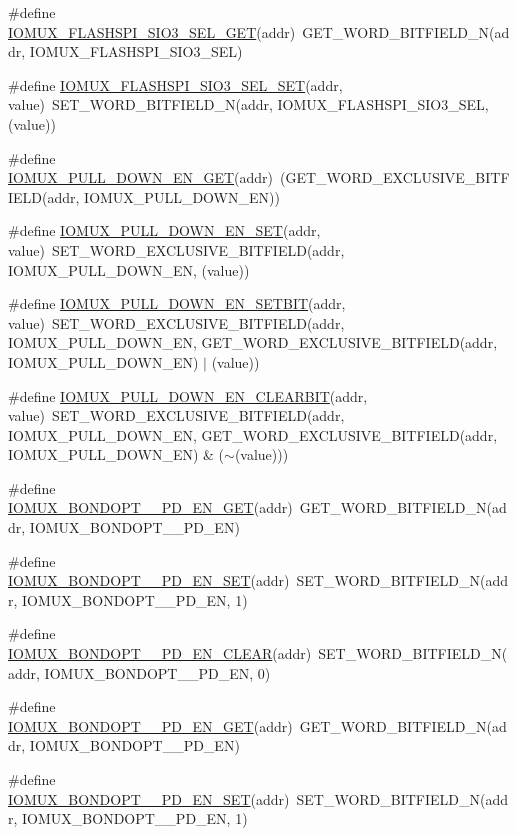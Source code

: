 \begin{DoxyCompactItemize}
\item 
\#define \hyperlink{a00559_a4c2a41675e009709ce5792c688d7d62a}{IOMUX\_\-FLASHSPI\_\-SIO3\_\-SEL\_\-GET}(addr)~GET\_\-WORD\_\-BITFIELD\_\-N(addr, IOMUX\_\-FLASHSPI\_\-SIO3\_\-SEL)
\item 
\#define \hyperlink{a00559_ad926c248ef64ee21e57821fd46ffbe88}{IOMUX\_\-FLASHSPI\_\-SIO3\_\-SEL\_\-SET}(addr, value)~SET\_\-WORD\_\-BITFIELD\_\-N(addr, IOMUX\_\-FLASHSPI\_\-SIO3\_\-SEL, (value))
\item 
\#define \hyperlink{a00559_a71104db525cde5d74f864e5716f4bfad}{IOMUX\_\-PULL\_\-DOWN\_\-EN\_\-GET}(addr)~(GET\_\-WORD\_\-EXCLUSIVE\_\-BITFIELD(addr, IOMUX\_\-PULL\_\-DOWN\_\-EN))
\item 
\#define \hyperlink{a00559_ad9faafa36f5fa3a0e319f2479645d5e1}{IOMUX\_\-PULL\_\-DOWN\_\-EN\_\-SET}(addr, value)~SET\_\-WORD\_\-EXCLUSIVE\_\-BITFIELD(addr, IOMUX\_\-PULL\_\-DOWN\_\-EN, (value))
\item 
\#define \hyperlink{a00559_a1db9e8f2b499c331b1dd4fb9789827ce}{IOMUX\_\-PULL\_\-DOWN\_\-EN\_\-SETBIT}(addr, value)~SET\_\-WORD\_\-EXCLUSIVE\_\-BITFIELD(addr, IOMUX\_\-PULL\_\-DOWN\_\-EN, GET\_\-WORD\_\-EXCLUSIVE\_\-BITFIELD(addr, IOMUX\_\-PULL\_\-DOWN\_\-EN) $|$ (value))
\item 
\#define \hyperlink{a00559_a7f694c31df3c4950d038391274b7996a}{IOMUX\_\-PULL\_\-DOWN\_\-EN\_\-CLEARBIT}(addr, value)~SET\_\-WORD\_\-EXCLUSIVE\_\-BITFIELD(addr, IOMUX\_\-PULL\_\-DOWN\_\-EN, GET\_\-WORD\_\-EXCLUSIVE\_\-BITFIELD(addr, IOMUX\_\-PULL\_\-DOWN\_\-EN) \& ($\sim$(value)))
\item 
\#define \hyperlink{a00559_a86224defbec2df1d22515be36688faa8}{IOMUX\_\-BONDOPT\_\_\-PD\_\-EN\_\-GET}(addr)~GET\_\-WORD\_\-BITFIELD\_\-N(addr, IOMUX\_\-BONDOPT\_\_\-PD\_\-EN)
\item 
\#define \hyperlink{a00559_aba0edce4b0aed648cb70fd62bc072f04}{IOMUX\_\-BONDOPT\_\_\-PD\_\-EN\_\-SET}(addr)~SET\_\-WORD\_\-BITFIELD\_\-N(addr, IOMUX\_\-BONDOPT\_\_\-PD\_\-EN, 1)
\item 
\#define \hyperlink{a00559_a0f019bd4771d0106a4253ba5884228a1}{IOMUX\_\-BONDOPT\_\_\-PD\_\-EN\_\-CLEAR}(addr)~SET\_\-WORD\_\-BITFIELD\_\-N(addr, IOMUX\_\-BONDOPT\_\_\-PD\_\-EN, 0)
\item 
\#define \hyperlink{a00559_a31868e4f7b695367fb494bafb5d39b63}{IOMUX\_\-BONDOPT\_\_\-PD\_\-EN\_\-GET}(addr)~GET\_\-WORD\_\-BITFIELD\_\-N(addr, IOMUX\_\-BONDOPT\_\_\-PD\_\-EN)
\item 
\#define \hyperlink{a00559_ad1ab6c6c6e37f754d136d9d1ee8e5ae1}{IOMUX\_\-BONDOPT\_\_\-PD\_\-EN\_\-SET}(addr)~SET\_\-WORD\_\-BITFIELD\_\-N(addr, IOMUX\_\-BONDOPT\_\_\-PD\_\-EN, 1)

\end{DoxyCompactItemize}
